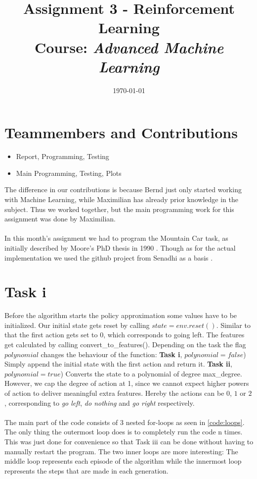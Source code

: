 \documentclass{article}
\title{Assignment 3 - Reinforcement Learning\\
		{\large Course: \textit{Advanced Machine Learning}}}
\date{\today}
\begin{document}
	
	\maketitle
	
	\section{Teammembers and Contributions}
	\label{sec:TeammembersAndContributions}
	
	\begin{itemize}
		\item {} Report, Programming, Testing
		\item {} Main Programming, Testing, Plots
	\end{itemize}
	
	\noindent The difference in our contributions is because Bernd just only started working with Machine Learning, while Maximilian has already prior knowledge in the subject. Thus we worked together, but the main programming work for this assignment was done by Maximilian. \\
	\\
	In this month's assignment we had to program the Mountain Car task, as initially described by Moore's PhD thesis in 1990 \cite{Moore90efficientmemory-based}. Though as for the actual implementation we used the github project from Senadhi as a basis \cite{MountainCar-v02018}. 
	
	
	\section{Task i}
	\label{sec:Taski}
	Before the algorithm starts the policy approximation some values have to be initialized. Our initial state gets reset by calling $state = env.reset()$. Similar to that the first action gets set to $0$, which corresponds to going left. The features get calculated by calling convert\_to\_features(). Depending on the task the flag $polynomial$ changes the behaviour of the function: \textbf{Task i}, $polynomial = false$) Simply append the initial state with the first action and return it. \textbf{Task ii}, $polynomial = true$) Converts the state to a polynomial of degree max\_degree. However, we cap the degree of action at 1, since we cannot expect higher powers of action to deliver meaningful extra features. Hereby the actions can be $0$, $1$ or $2$, corresponding to \textit{go left}, \textit{do nothing} and \textit{go right} respectively.\\
	\\
	The main part of the code consists of 3 nested for-loops as seen in \autoref{code:loops}. The only thing the outermost loop does is to completely run the code n times. This was just done for convenience so that Task iii can be done without having to manually restart the program. The two inner loops are more interesting: The middle loop represents each episode of the algorithm while the innermost loop represents the steps that are made in each generation. 
	
\end{document}

